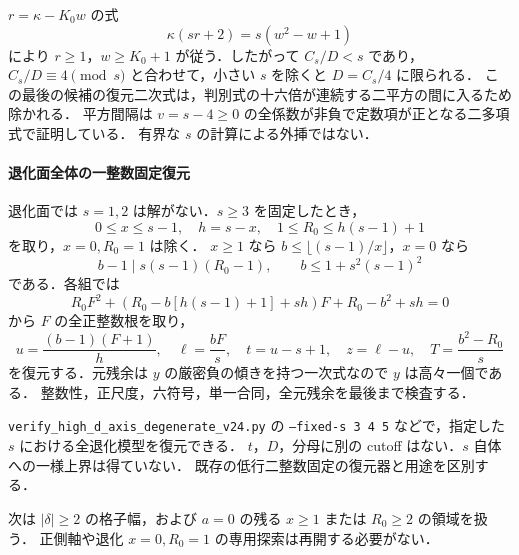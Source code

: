 $r=\kappa-K_0w$ の式
\[
 \kappa(sr+2)=s(w^2-w+1)
\]
により $r\ge1$，$w\ge K_0+1$ が従う．したがって $C_s/D<s$ であり，
$C_s/D\equiv4\pmod s$ と合わせて，小さい $s$ を除くと $D=C_s/4$ に限られる．
この最後の候補の復元二次式は，判別式の十六倍が連続する二平方の間に入るため除かれる．
平方間隔は $v=s-4\ge0$ の全係数が非負で定数項が正となる二多項式で証明している．
有界な $s$ の計算による外挿ではない．

\paragraph{退化面全体の一整数固定復元}

退化面では $s=1,2$ は解がない．$s\ge3$ を固定したとき，
\[
 0\le x\le s-1,\quad h=s-x,\quad
 1\le R_0\le h(s-1)+1
\]
を取り，$x=0,R_0=1$ は除く．
$x\ge1$ なら $b\le\lfloor(s-1)/x\rfloor$，$x=0$ なら
\[
 b-1\mid s(s-1)(R_0-1),\qquad b\le1+s^2(s-1)^2
\]
である．各組では
\[
 R_0F^2+(R_0-b[h(s-1)+1]+sh)F+R_0-b^2+sh=0
\]
から $F$ の全正整数根を取り，
\[
 u=\frac{(b-1)(F+1)}h,\quad \ell=\frac{bF}s,\quad
 t=u-s+1,\quad z=\ell-u,\quad T=\frac{b^2-R_0}s
\]
を復元する．元残余は $y$ の厳密負の傾きを持つ一次式なので $y$ は高々一個である．
整数性，正尺度，六符号，単一合同，全元残余を最後まで検査する．

\nolinkurl{verify_high_d_axis_degenerate_v24.py} の
\texttt{--fixed-s 3 4 5} などで，指定した $s$ における全退化模型を復元できる．
$t$，$D$，分母に別の cutoff はない．$s$ 自体への一様上界は得ていない．
既存の低行二整数固定の復元器と用途を区別する．

次は $|\delta|\ge2$ の格子幅，および $a=0$ の残る $x\ge1$ または $R_0\ge2$ の領域を扱う．
正側軸や退化 $x=0,R_0=1$ の専用探索は再開する必要がない．
